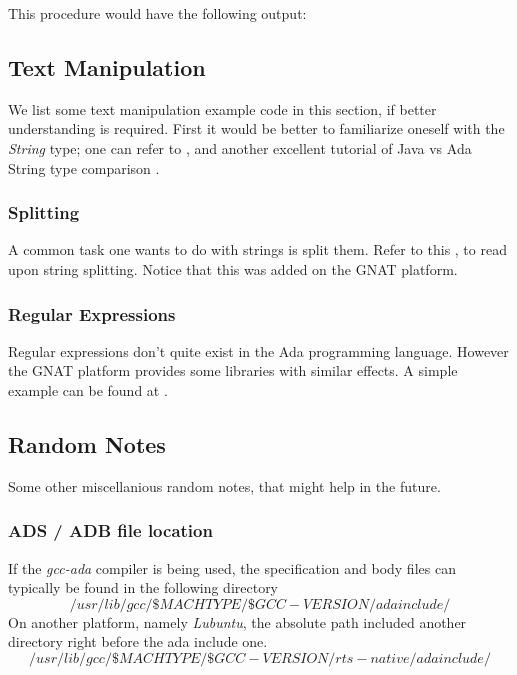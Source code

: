 This procedure would have the following output:


\subsection{Text Manipulation}
We list some text manipulation example code in this section, if better understanding is required. First it would be better to familiarize oneself with the \textit{String} type; one can refer to \cite{AdaStringType}, and another excellent tutorial of Java vs Ada String type comparison \cite{AdaStringVersusJavaString}.

\subsubsection{Splitting}
A common task one wants to do with strings is split them. Refer to this \cite{AdaStringSplit}, to read upon string splitting. Notice that this was added on the GNAT platform.

\subsubsection{Regular Expressions}
Regular expressions don't quite exist in the Ada programming language. However the GNAT platform provides some libraries with similar effects. A simple example can be found at \cite{AdaRegularExpressions}.


\subsection{Random Notes}
Some other miscellanious random notes, that might help in the future. 


\subsubsection{ADS / ADB file location}
If the \textit{gcc-ada} compiler is being used, the specification and body files can typically be found in the following directory
$$ /usr/lib/gcc/\$MACHTYPE/\$GCC-VERSION/adainclude/ $$
On another platform, namely \textit{Lubuntu}, the absolute path included another directory right before the ada include one.
$$ /usr/lib/gcc/\$MACHTYPE/\$GCC-VERSION/rts-native/adainclude/ $$

